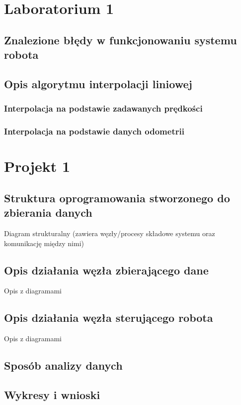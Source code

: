 \documentclass{mwrep}
\begin{document}
\tableofcontents

\chapter{Laboratorium 1}

\section{Znalezione błędy w funkcjonowaniu systemu robota}

\section{Opis algorytmu interpolacji liniowej}

\subsection{Interpolacja na podstawie zadawanych prędkości}

\subsection{Interpolacja na podstawie danych odometrii}


\chapter{Projekt 1}

\section{Struktura oprogramowania stworzonego do zbierania danych}
Diagram strukturalny (zawiera węzły/procesy składowe systemu oraz komunikację między
nimi)
\section{Opis działania węzła zbierającego dane}
Opis z diagramami
\section{Opis działania węzła sterującego robota}
Opis z diagramami
\section{Sposób analizy danych}

\section{Wykresy i wnioski}
\end{document}
